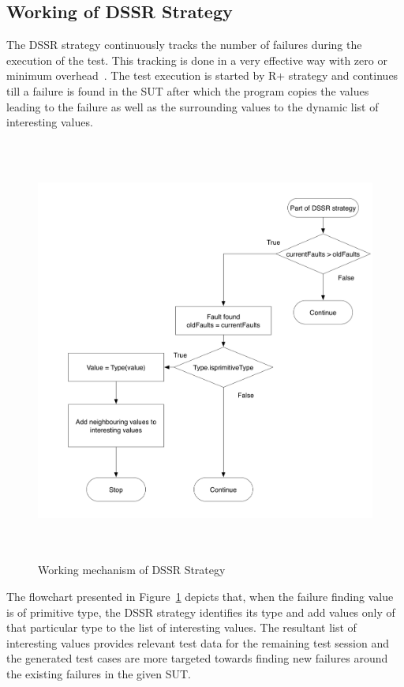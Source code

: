 \subsection{Working of DSSR Strategy}

The DSSR strategy continuously tracks the number of failures during the execution of the test. This tracking is done in a very effective way with zero or minimum overhead~\cite{leitner2009effectiveness}. The test execution is started by R+ strategy and continues till a failure is found in the SUT after which the program copies the values leading to the failure as well as the surrounding values to the dynamic list of interesting values. 

\begin{figure}[ht]
\centering
\includegraphics[width=12cm, height=14cm]{chapter4/flowchart1.png}
\caption{Working mechanism of DSSR Strategy}
\label{fig:Working_DSSS}
\end{figure}

The flowchart presented in Figure~\ref{fig:Working_DSSS} depicts that, when the failure finding value is of primitive type, the DSSR strategy identifies its type and add values only of that particular type to the list of interesting values. The resultant list of interesting values provides relevant test data for the remaining test session and the generated test cases are more targeted towards finding new failures around the existing failures in the given SUT.

